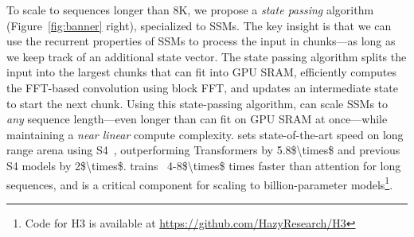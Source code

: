 To scale to sequences longer than 8K, we propose a \textit{state passing} algorithm (Figure~\ref{fig:banner} right), specialized to SSMs.
The key insight is that we can use the recurrent properties of SSMs to process the input in chunks---as long as we keep track of an additional state vector.
The state passing algorithm splits the input into the largest chunks that can fit into GPU SRAM, efficiently computes the FFT-based convolution using block FFT, and updates an intermediate state to start the next chunk.
Using this state-passing algorithm, \fastfft can scale SSMs to \textit{any} sequence length---even longer than can fit on GPU SRAM at once---while maintaining a \textit{near linear} compute complexity.
\fastfft sets state-of-the-art speed on long range arena using S4~\citep{gu2022efficiently}, outperforming Transformers by \num{5.8$\times$} and previous S4 models by \num{2$\times$}.
\fastfft trains \hthree\ \num{4-8$\times$} times faster than attention for long sequences, and is a critical component for scaling to billion-parameter models\footnote{Code for H3 is available at \url{https://github.com/HazyResearch/H3} }.

